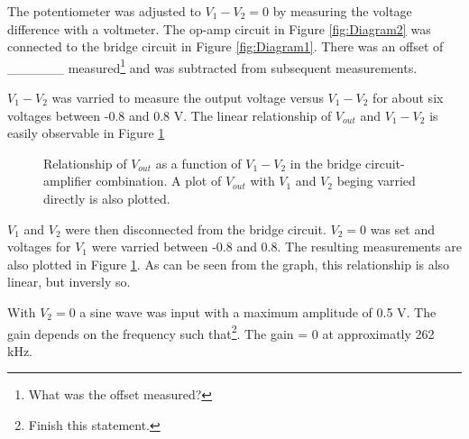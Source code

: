 \documentclass[11pt,onecolumn]{article}
\begin{document}
The potentiometer was adjusted to $V_1 - V_2 = 0$ by measuring the voltage difference with a voltmeter. The op-amp circuit in Figure \ref{fig:Diagram2} was connected to the bridge circuit in Figure \ref{fig:Diagram1}. There was an offset of \_\_\_\_\_\_ measured\footnote{What was the offset measured?} and was subtracted from subsequent measurements.

$V_1 - V_2$ was varried to measure the output voltage versus $V_1 - V_2$ for about six voltages between -0.8 and 0.8 V. The linear relationship of $V_{out}$ and $V_1 - V_2$ is easily observable in Figure \ref{fig:Plot01}
%
%
\begin{figure}
\center

\caption{Relationship of $V_{out}$ as a function of $V_1 - V_2$ in the bridge circuit-amplifier combination. A plot of $V_{out}$ with $V_1$ and $V_2$ beging varried directly is also plotted.}\label{fig:Plot01}
\end{figure}

$V_1$ and $V_2$ were then disconnected from the bridge circuit. $V_2 = 0$ was set and voltages for $V_1$ were varried between -0.8 and 0.8. The resulting measurements are also plotted in Figure \ref{fig:Plot01}. As can be seen from the graph, this relationship is also linear, but inversly so.

With $V_2 = 0$ a sine wave was input with a maximum amplitude of 0.5 V. The gain depends on the frequency such that\footnote{Finish this statement.}. The gain = 0 at approximatly 262 kHz.
\end{document}
